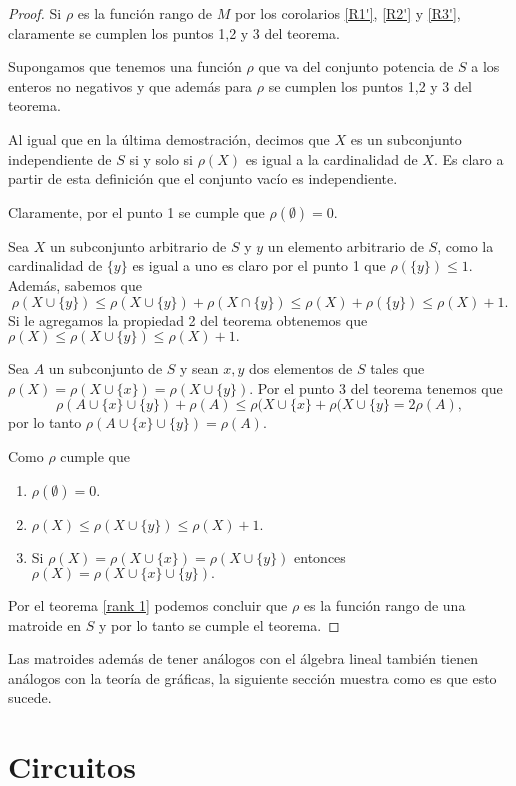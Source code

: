 \begin{proof}
Si $\rho $ es la función rango de $M$ por los corolarios \ref{R1'}, \ref{R2'} y \ref{R3'}, claramente se cumplen los puntos 1,2 y 3 del teorema. 

Supongamos que tenemos una función $\rho$ que va del conjunto potencia de $S$ a los enteros no negativos y que además para $\rho$ se cumplen los puntos 1,2 y 3 del teorema. 

Al igual que en la última demostración, decimos que $X$ es un subconjunto independiente de $S$ si y solo si $\rho(X)$ es igual a la cardinalidad de $X$. Es claro a partir de esta definición que el conjunto vacío es independiente. 

Claramente, por el punto 1 se cumple que $\rho(\emptyset) =0.$

Sea $X$ un subconjunto arbitrario de $S$ y $y$ un elemento arbitrario de $S$, como la cardinalidad de $\{y\}$ es igual a uno es claro por el punto 1 que $\rho(\{y\})\leq 1$. Además, sabemos que 
$$\rho(X \cup \{y\}) \leq \rho(X \cup \{y\}) + \rho(X \cap \{y\}) \leq \rho(X) + \rho(\{y\}) \leq \rho(X) +1. $$
Si le agregamos la propiedad 2 del teorema obtenemos que $\rho(X) \leq \rho(X \cup \{y\}) \leq \rho(X)+1.$ 

Sea $A$ un subconjunto de $S$ y sean $x,y$ dos elementos de $S$ tales que $\rho(X)=\rho(X \cup \{ x\}) =\rho(X \cup \{ y\}) .$ Por el punto 3 del teorema tenemos que 
$$\rho(A \cup \{x\} \cup \{y\}) + \rho(A) \leq \rho(X \cup \{ x\} + \rho(X \cup \{ y\} = 2 \rho(A),$$
por lo tanto $\rho(A \cup \{x\} \cup \{y\}) = \rho(A)$. 

Como $\rho$ cumple que 
\begin{enumerate}
\item $\rho(\emptyset) =0.$
\item $\rho(X) \leq \rho(X \cup \{y\}) \leq \rho(X)+1.$
\item Si $\rho(X)=\rho(X \cup \{ x\}) =\rho(X \cup \{ y\}) $ entonces $\rho(X)=\rho(X \cup \{ x\} \cup \{ y\}).$
\end{enumerate}
Por el teorema \ref{rank 1} podemos concluir que $\rho$ es la función rango de una matroide en $S$ y por lo tanto se cumple el teorema. 
\end{proof}

Las matroides además de tener análogos con el álgebra lineal también tienen análogos con la teoría de gráficas, la siguiente sección muestra como es que esto sucede. 

\section{Circuitos}


